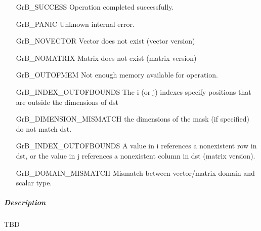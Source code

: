 \begin{itemize}[leftmargin=2.1in]
\item[{\sf GrB\_SUCCESS}]             Operation completed successfully.
\item[{\sf GrB\_PANIC}]               Unknown internal error.
\item[{\sf GrB\_NOVECTOR}]            Vector does not exist (vector version)
\item[{\sf GrB\_NOMATRIX}]            Matrix does not exist (matrix version)
\item[{\sf GrB\_OUTOFMEM}]            Not enough memory available for operation.
\item[{\sf GrB\_INDEX\_OUTOFBOUNDS}]  The i (or j) indexes specify positions that are outside the dimensions of dst
\item[{\sf GrB\_DIMENSION\_MISMATCH}] 
        the dimensions of the mask (if specified) do not match dst.
\item[{\sf GrB\_INDEX\_OUTOFBOUNDS}]
        A value in i references a nonexistent row in dst, or
        the value in j references a nonexistent column in dst (matrix version).
\item[{\sf GrB\_DOMAIN\_MISMATCH}]    Mismatch between vector/matrix domain and scalar type.
\end{itemize}

\subparagraph{Description}

TBD
